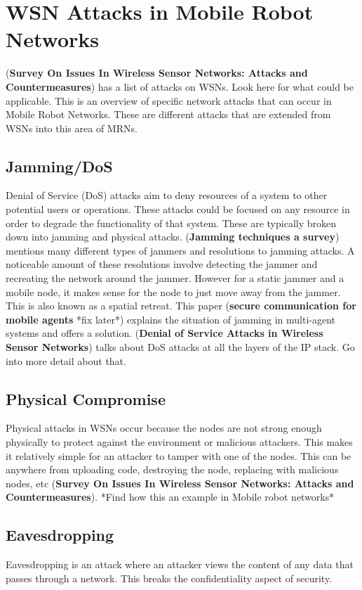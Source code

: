 \section{WSN Attacks in Mobile Robot Networks}
(\textbf{Survey On Issues In Wireless Sensor Networks: Attacks and Countermeasures}) has a list of attacks on WSNs. Look here for what could be applicable. \newline
This is an overview of specific network attacks that can occur in Mobile Robot Networks. These are different attacks that are extended from WSNs into this area of MRNs.  
\subsection{Jamming/DoS}
Denial of Service (DoS) attacks aim to deny resources of a system to other potential users or operations. These attacks could be focused on any resource in order to degrade the functionality of that system. These are typically broken down into jamming and physical attacks. \newline
(\textbf{Jamming techniques a survey}) mentions many different types of jammers and resolutions to jamming attacks. A noticeable amount of these resolutions involve detecting the jammer and recreating the network around the jammer. However for a static jammer and a mobile node, it makes sense for the node to just move away from the jammer. This is also known as a spatial retreat. This paper (\textbf{secure communication for mobile agents} *fix later*) explains the situation of jamming in multi-agent systems and offers a solution. \newline
(\textbf{Denial of Service Attacks in Wireless Sensor Networks}) talks about DoS attacks at all the layers of the IP stack. Go into more detail about that. 
\subsection{Physical Compromise}
Physical attacks in WSNs occur because the nodes are not strong enough physically to protect against the environment or malicious attackers. This makes it relatively simple for an attacker to tamper with one of the nodes. This can be anywhere from uploading code, destroying the node, replacing with malicious nodes, etc (\textbf{Survey On Issues In Wireless Sensor Networks: Attacks and Countermeasures}). *Find how this an example in Mobile robot networks* 
\subsection{Eavesdropping}
Eavesdropping is an attack where an attacker views the content of any data that passes through a network. This breaks the confidentiality aspect of security. 
